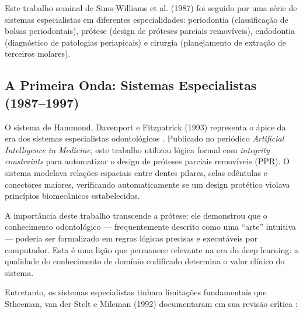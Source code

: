 Este trabalho seminal de Sims-Williams et al. (1987) \cite{ODT-052} foi seguido por uma série de sistemas especialistas em diferentes especialidades: periodontia (classificação de bolsas periodontais), prótese (design de próteses parciais removíveis), endodontia (diagnóstico de patologias periapicais) e cirurgia (planejamento de extração de terceiros molares).

\subsection{A Primeira Onda: Sistemas Especialistas (1987--1997)}

O sistema de Hammond, Davenport e Fitzpatrick (1993) representa o ápice da era dos sistemas especialistas odontológicos \cite{ODT-003}. Publicado no periódico \textit{Artificial Intelligence in Medicine}, este trabalho utilizou lógica formal com \textit{integrity constraints} para automatizar o design de próteses parciais removíveis (PPR). O sistema modelava relações espaciais entre dentes pilares, selas edêntulas e conectores maiores, verificando automaticamente se um design protético violava princípios biomecânicos estabelecidos.


A importância deste trabalho transcende a prótese: ele demonstrou que o conhecimento odontológico — frequentemente descrito como uma ``arte'' intuitiva — poderia ser formalizado em regras lógicas precisas e executáveis por computador. Esta é uma lição que permanece relevante na era do deep learning: a qualidade do conhecimento de domínio codificado determina o valor clínico do sistema.

Entretanto, os sistemas especialistas tinham limitações fundamentais que Stheeman, van der Stelt e Mileman (1992) documentaram em sua revisão crítica \cite{ODT-008}:


